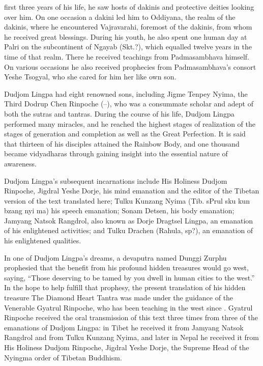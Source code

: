 \documentclass[a4paper,11pt,twoside,final]{book}
\begin{document}
first three years of his life, he saw hosts of dakinis and protective
deities looking over him.  On one occasion a dakini led him to
Oddiyana, the realm of the dakinis, where he encountered Vajravarahi,
foremost of the dakinis, from whom he received great blessings. During
his youth, he also spent one human day at Palri on the subcontinent of
Ngayab (Skt.?), which equalled twelve years in the time of that
realm. There he received teachings from Padmasambhava himself. On
various occasions he also received prophecies from Padmasambhava's
consort Yeshe Tsogyal, who she cared for him her like own son.

Dudjom Lingpa had eight renowned sons, including Jigme Tenpey Nyima,
the Third Dodrup Chen Rinpoche
(--), who was a consummate
scholar and adept of both the sutras and tantras. During the course of
his life, Dudjom Lingpa performed many miracles, and he reached the
highest stages of realization of the stages of generation and
completion as well as the Great Perfection. It is said that thirteen
of his disciples attained the Rainbow Body, and one thousand became
vidyadharas through gaining insight into the essential nature of
awareness.

Dudjom Lingpa's subsequent incarnations include His Holiness Dudjom
Rinpoche, Jigdral Yeshe Dorje, his mind emanation and the editor of
the Tibetan version of the text translated here; Tulku Kunzang Nyima
(Tib. sPrul sku kun bzang nyi ma) his speech emanation; Sonam Detsen,
his body emanation; Jamyang Natsok Rangdrol, also known as Dorje
Dragtsel Lingpa, an emanation of his enlightened activities; and Tulku
Drachen (Rahula, sp?), an emanation of his enlightened qualities.

In one of Dudjom Lingpa's dreams, a devaputra named Dunggi Zur\-phu
prophesied that the benefit from his profound hidden treasures would
go west, saying, ``Those deserving to be tamed by you dwell in human
cities to the west.'' In the hope to help fulfill that prophesy, the
present translation of his hidden treasure The Diamond Heart Tantra
was made under the guidance of the Venerable Gyatrul Rinpoche, who has
been teaching in the west since . Gyatrul Rinpoche
received the oral transmission of this text three times from three of
the emanations of Dudjom Lingpa: in Tibet he received it from Jamyang
Natsok Rangdrol and from Tulku Kunzang Nyima, and later in Nepal he
received it from His Holiness Dudjom Rinpoche, Jigdral Yeshe Dorje,
the Supreme Head of the Nyingma order of Tibetan Buddhism.
\end{document}
